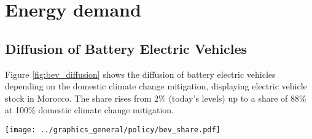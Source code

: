 

\section{Energy demand}

\subsection{Diffusion of Battery Electric Vehicles}
\label{subsec:bev_diffusion}
Figure \ref{fig:bev_diffusion} shows the diffusion of battery electric vehicles depending on the domestic climate change mitigation, displaying electric vehicle stock in Morocco. The share rises from 2\% (today's levels) up to a share of 88\% at 100\% domestic climate change mitigation. %

\begin{figure*}[h]
    \centering
    \texttt{[image: ../graphics\_general/policy/bev\_share.pdf]}
    \caption{Market diffusion of Battery Electricity Vehicles in Morocco, synthesized based on an s-curve with a growth rate $k=0.2$ and inflection point $x_0=2040$.}
    \label{fig:bev_diffusion}
\end{figure*}

\clearpage
